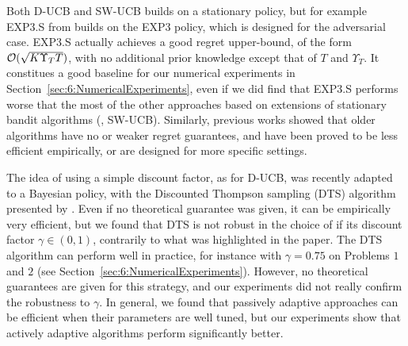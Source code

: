 Both D-UCB and SW-UCB builds on a stationary policy, but for example EXP3.S from \cite{Auer02NonStochastic}
builds on the EXP3 policy, which is designed for the adversarial case.
EXP3.S actually achieves a good regret upper-bound, of the form $\mathcal{O}(\sqrt{K \Upsilon_T T})$, with no additional prior knowledge except that of $T$ and $\Upsilon_T$.
It constitues a good baseline for our numerical experiments in Section~\ref{sec:6:NumericalExperiments},
even if we did find that EXP3.S performs worse that the most of the other approaches based on extensions of stationary bandit algorithms (\eg, SW-UCB).
Similarly, previous works showed that older algorithms have no or weaker regret guarantees, and have been proved to be less efficient empirically, or are designed for more specific settings.


The idea of using a simple discount factor, as for D-UCB, was recently adapted to a Bayesian policy, with the Discounted Thompson sampling (DTS) algorithm presented by \cite{RajKalyani17}.
Even if no theoretical guarantee was given, it can be empirically very efficient, but we found that DTS is not robust in the choice of if its discount factor $\gamma\in(0,1)$, contrarily to what was highlighted in the paper.
The DTS algorithm can perform well in practice, for instance with $\gamma=0.75$ on Problems $1$ and $2$ (see Section~\ref{sec:6:NumericalExperiments}). However, no theoretical guarantees are given for this strategy, and our experiments did not really confirm the robustness to $\gamma$.
%
In general, we found that passively adaptive approaches can be efficient when their parameters are well tuned, but our experiments show that actively adaptive algorithms perform significantly better.




